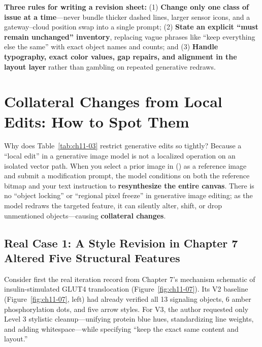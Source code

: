 \begin{BookNote}
\textbf{Three rules for writing a revision sheet:} (1) \textbf{Change only one class of issue at a time}---never bundle thicker dashed lines, larger sensor icons, and a gateway--cloud position swap into a single prompt; (2) \textbf{State an explicit ``must remain unchanged'' inventory}, replacing vague phrases like ``keep everything else the same'' with exact object names and counts; and (3) \textbf{Handle typography, exact color values, gap repairs, and alignment in the layout layer} rather than gambling on repeated generative redraws.
\end{BookNote}

\section{Collateral Changes from Local Edits: How to Spot Them}

Why does Table~\ref{tab:ch11-03} restrict generative edits so tightly? Because a ``local edit'' in a generative image model is not a localized operation on an isolated vector path. When you select a prior image in \scidraw{} () as a reference image and submit a modification prompt, the model conditions on both the reference bitmap and your text instruction to \textbf{resynthesize the entire canvas}. There is no ``object locking'' or ``regional pixel freeze'' in generative image editing; as the model redraws the targeted feature, it can silently alter, shift, or drop unmentioned objects---causing \textbf{collateral changes}.

\subsection{Real Case 1: A Style Revision in Chapter 7 Altered Five Structural Features}

Consider first the real iteration record from Chapter 7's mechanism schematic of insulin-stimulated GLUT4 translocation (Figure~\ref{fig:ch11-07}). Its V2 baseline (Figure~\ref{fig:ch11-07}, left) had already verified all 13 signaling objects, 6 amber phosphorylation dots, and five arrow styles. For V3, the author requested only Level 3 stylistic cleanup---unifying protein blue hues, standardizing line weights, and adding whitespace---while specifying ``keep the exact same content and layout.''

